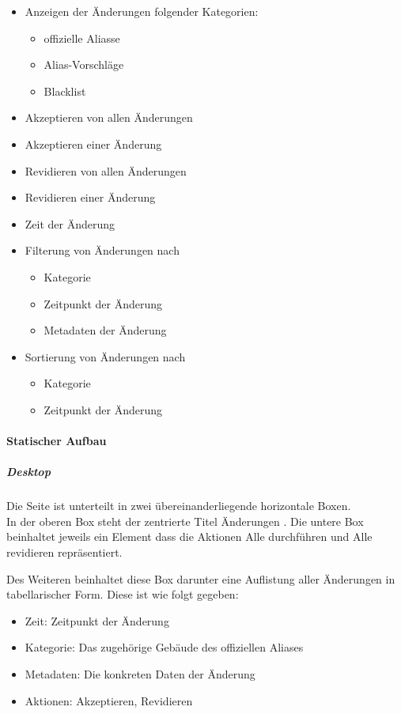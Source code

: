 \begin{itemize}
    \item Anzeigen der Änderungen folgender Kategorien: \begin{itemize}
        \item offizielle Aliasse
        \item Alias-Vorschläge
        \item Blacklist
    \end{itemize}
    \item Akzeptieren von allen Änderungen
    \item Akzeptieren einer Änderung
    \item Revidieren von allen Änderungen
    \item Revidieren einer Änderung
    \item Zeit der Änderung
    \item Filterung von Änderungen nach 
    \begin{itemize}
        \item Kategorie
        \item Zeitpunkt der Änderung
        \item Metadaten der Änderung
    \end{itemize}
    \item Sortierung von Änderungen nach 
    \begin{itemize}
        \item Kategorie
        \item Zeitpunkt der Änderung
    \end{itemize}
\end{itemize}

\paragraph*{Statischer Aufbau}
\subparagraph*{Desktop}
Die Seite ist unterteilt in zwei übereinanderliegende horizontale Boxen. \\
In der oberen Box steht der zentrierte Titel \dq Änderungen \dq.
Die untere Box beinhaltet jeweils ein Element dass die Aktionen \dq Alle durchführen\dq{} und \dq Alle revidieren\dq{} repräsentiert.

Des Weiteren beinhaltet diese Box darunter eine Auflistung aller Änderungen in tabellarischer Form. Diese ist wie folgt gegeben:

\begin{itemize}
    \item Zeit: Zeitpunkt der Änderung
    \item Kategorie: Das zugehörige Gebäude des offiziellen Aliases
    \item Metadaten: Die konkreten Daten der Änderung
    \item Aktionen: Akzeptieren, Revidieren
\end{itemize}

